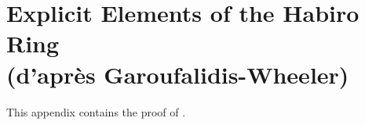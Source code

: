 \section{Explicit Elements of the Habiro Ring \\ (d'apr\`{e}s Garoufalidis-Wheeler)}\label{appdx: explicit elements}
This appendix contains the proof of .